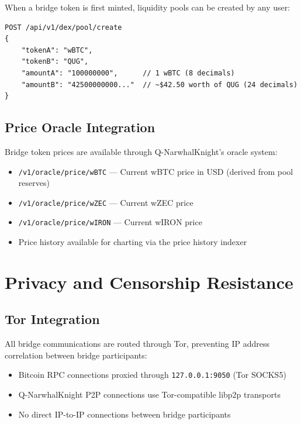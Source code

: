 \documentclass[11pt,a4paper]{article}
\begin{document}
When a bridge token is first minted, liquidity pools can be created by any user:

\begin{lstlisting}[language={},title={Pool Creation API}]
POST /api/v1/dex/pool/create
{
    "tokenA": "wBTC",
    "tokenB": "QUG",
    "amountA": "100000000",      // 1 wBTC (8 decimals)
    "amountB": "42500000000..."  // ~$42.50 worth of QUG (24 decimals)
}
\end{lstlisting}

\subsection{Price Oracle Integration}

Bridge token prices are available through Q-NarwhalKnight's oracle system:

\begin{itemize}
    \item \texttt{/v1/oracle/price/wBTC} --- Current wBTC price in USD (derived from pool reserves)
    \item \texttt{/v1/oracle/price/wZEC} --- Current wZEC price
    \item \texttt{/v1/oracle/price/wIRON} --- Current wIRON price
    \item Price history available for charting via the price history indexer
\end{itemize}

\section{Privacy and Censorship Resistance}
\label{sec:privacy}

\subsection{Tor Integration}

All bridge communications are routed through Tor, preventing IP address correlation between bridge participants:

\begin{itemize}
    \item Bitcoin RPC connections proxied through \texttt{127.0.0.1:9050} (Tor SOCKS5)
    \item Q-NarwhalKnight P2P connections use Tor-compatible libp2p transports
    \item No direct IP-to-IP connections between bridge participants
\end{itemize}
\end{document}
